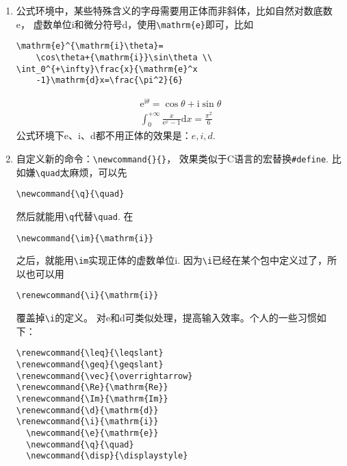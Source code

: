 \documentclass[fontset=windows]{article}
\newcommand{\q}{\quad}
\begin{document}
\begin{multicols}{2}
\begin{enumerate}
\item 公式环境中，某些特殊含义的字母需要用正体而非斜体，比如自然对数底数e，
虚数单位i和微分符号d，使用\verb|\mathrm{e}|即可，比如
\begin{lstlisting}
\mathrm{e}^{\mathrm{i}\theta}=
    \cos\theta+{\mathrm{i}}\sin\theta \\
\int_0^{+\infty}\frac{x}{\mathrm{e}^x
    -1}\mathrm{d}x=\frac{\pi^2}{6}    
\end{lstlisting} 
\begin{gather*}
    \mathrm{e}^{\mathrm{i}\theta}=
    \cos\theta+{\mathrm{i}}\sin\theta \\
    \int_0^{+\infty}\frac{x}{\mathrm{e}^x
    -1}\mathrm{d}x=\frac{\pi^2}{6} 
\end{gather*}
公式环境下e、i、d都不用正体的效果是：$ e,i,d $.

\item 自定义新的命令：\verb|\newcommand{}{}|，
效果类似于C语言的宏替换\verb|#define|. 
比如嫌\verb|\quad|太麻烦，可以先
\begin{lstlisting}
\newcommand{\q}{\quad}    
\end{lstlisting} 
然后就能用\verb|\q|代替\verb|\quad|. 
在
\begin{lstlisting}
\newcommand{\im}{\mathrm{i}}    
\end{lstlisting} 
之后，就能用\verb|\im|实现正体的虚数单位$ \mathrm{i} $.
因为\verb|\i|已经在某个包中定义过了，所以也可以用
\begin{lstlisting}
\renewcommand{\i}{\mathrm{i}}    
\end{lstlisting} 
覆盖掉\verb|\i|的定义。
对e和d可类似处理，提高输入效率。个人的一些习惯如下：
\begin{lstlisting}
\renewcommand{\leq}{\leqslant}
\renewcommand{\geq}{\geqslant} 
\renewcommand{\vec}{\overrightarrow}
\renewcommand{\Re}{\mathrm{Re}}
\renewcommand{\Im}{\mathrm{Im}}
\renewcommand{\d}{\mathrm{d}}
\renewcommand{\i}{\mathrm{i}} 
  \newcommand{\e}{\mathrm{e}}
  \newcommand{\q}{\quad}
  \newcommand{\disp}{\displaystyle}    
\end{lstlisting} 


\end{enumerate}
\end{multicols}
\end{document}
